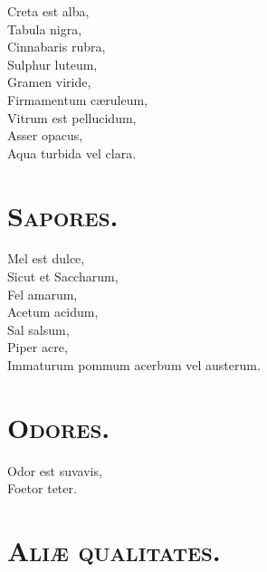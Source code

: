 \documentclass[12pt, twocolumn]{memoir}
\begin{document}
Creta est alba,\\
Tabula nigra,\\
Cinnabaris rubra,\\
Sulphur luteum,\\
Gramen viride,\\
Firmamentum cæruleum,\\
Vitrum est pellucidum,\\
Asser opacus,\\
Aqua turbida vel clara.\\

\section*{\textsc{Sapores.}}

Mel est dulce,\\
Sicut et Saccharum,\\
Fel amarum,\\
Acetum acidum,\\
Sal salsum,\\
Piper acre,\\
Immaturum pommum acerbum vel austerum.\\

\section*{\textsc{Odores.}}

Odor est suvavis,\\
Foetor teter.\\

\section*{\textsc{Aliæ qualitates.}}
\end{document}
